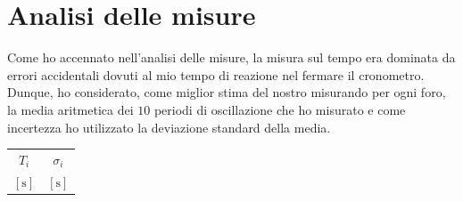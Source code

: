 \documentclass{article}
\begin{document}
\section{Analisi delle misure}
Come ho accennato nell'analisi delle misure, la misura sul tempo era dominata da errori accidentali dovuti al mio tempo di reazione nel fermare il cronometro. Dunque, ho considerato, come miglior stima del nostro misurando per ogni foro, la media aritmetica dei $10$ periodi di oscillazione che ho misurato e come incertezza ho utilizzato la deviazione standard della media. \\

\begin{table}
	\centering
	\begin{tabular}{c c} \toprule
		$T_i$ & $\sigma_i$ \\
		$[\si{\second}]$ & $[\si{\second}]$ \\ \toprule
		
	\end{tabular}
\end{table}
\end{document}
